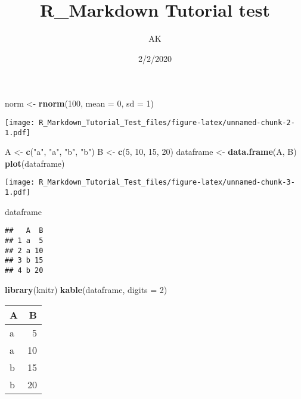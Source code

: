 \documentclass[]{article}
\title{R\_Markdown Tutorial test}
\author{AK}
\date{2/2/2020}
\newenvironment{Shaded}{\begin{snugshade}}{\end{snugshade}}
\newcommand{\DataTypeTok}[1]{\textcolor[rgb]{0.13,0.29,0.53}{#1}}
\newcommand{\DecValTok}[1]{\textcolor[rgb]{0.00,0.00,0.81}{#1}}
\newcommand{\KeywordTok}[1]{\textcolor[rgb]{0.13,0.29,0.53}{\textbf{#1}}}
\newcommand{\NormalTok}[1]{#1}
\newcommand{\StringTok}[1]{\textcolor[rgb]{0.31,0.60,0.02}{#1}}
\begin{document}
\maketitle

\begin{Shaded}
\begin{Highlighting}[]
\NormalTok{norm <-}\StringTok{ }\KeywordTok{rnorm}\NormalTok{(}\DecValTok{100}\NormalTok{, }\DataTypeTok{mean =} \DecValTok{0}\NormalTok{, }\DataTypeTok{sd =} \DecValTok{1}\NormalTok{)}
\end{Highlighting}
\end{Shaded}

\texttt{[image: R\_Markdown\_Tutorial\_Test\_files/figure-latex/unnamed-chunk-2-1.pdf]}

\begin{Shaded}
\begin{Highlighting}[]
\NormalTok{A <-}\StringTok{ }\KeywordTok{c}\NormalTok{(}\StringTok{"a"}\NormalTok{, }\StringTok{"a"}\NormalTok{, }\StringTok{"b"}\NormalTok{, }\StringTok{"b"}\NormalTok{)}
\NormalTok{B <-}\StringTok{ }\KeywordTok{c}\NormalTok{(}\DecValTok{5}\NormalTok{, }\DecValTok{10}\NormalTok{, }\DecValTok{15}\NormalTok{, }\DecValTok{20}\NormalTok{)}
\NormalTok{dataframe <-}\StringTok{ }\KeywordTok{data.frame}\NormalTok{(A, B)}
\KeywordTok{plot}\NormalTok{(dataframe)}
\end{Highlighting}
\end{Shaded}

\texttt{[image: R\_Markdown\_Tutorial\_Test\_files/figure-latex/unnamed-chunk-3-1.pdf]}

\begin{Shaded}
\begin{Highlighting}[]
\NormalTok{dataframe}
\end{Highlighting}
\end{Shaded}

\begin{verbatim}
##   A  B
## 1 a  5
## 2 a 10
## 3 b 15
## 4 b 20
\end{verbatim}

\begin{Shaded}
\begin{Highlighting}[]
\KeywordTok{library}\NormalTok{(knitr)}
\KeywordTok{kable}\NormalTok{(dataframe, }\DataTypeTok{digits =} \DecValTok{2}\NormalTok{)}
\end{Highlighting}
\end{Shaded}

\begin{longtable}[]{@{}lr@{}}
\toprule
A & B\tabularnewline
\midrule
\endhead
a & 5\tabularnewline
a & 10\tabularnewline
b & 15\tabularnewline
b & 20\tabularnewline
\bottomrule
\end{longtable}
\end{document}

